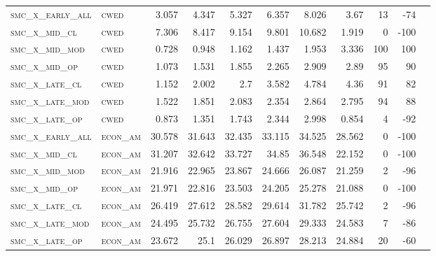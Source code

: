 \begin{landscape}
\begin{center}
\begin{footnotesize}
\begin{longtable}{llrrrrrr|rrr}
\textsc{smc\_x\_early\_all} & \textsc{cwed      }   & 3.057      & 4.347      & 5.327      & 6.357      & 8.026      & 3.67       & 13    & -74    \\
\textsc{smc\_x\_mid\_cl   } & \textsc{cwed      }   & 7.306      & 8.417      & 9.154      & 9.801      & 10.682     & 1.919      & 0     & -100   \\
\textsc{smc\_x\_mid\_mod  } & \textsc{cwed      }   & 0.728      & 0.948      & 1.162      & 1.437      & 1.953      & 3.336      & 100   & 100    \\
\textsc{smc\_x\_mid\_op   } & \textsc{cwed      }   & 1.073      & 1.531      & 1.855      & 2.265      & 2.909      & 2.89       & 95    & 90     \\
\textsc{smc\_x\_late\_cl  } & \textsc{cwed      }   & 1.152      & 2.002      & 2.7        & 3.582      & 4.784      & 4.36       & 91    & 82     \\
\textsc{smc\_x\_late\_mod } & \textsc{cwed      }   & 1.522      & 1.851      & 2.083      & 2.354      & 2.864      & 2.795      & 94    & 88     \\
\textsc{smc\_x\_late\_op  } & \textsc{cwed      }   & 0.873      & 1.351      & 1.743      & 2.344      & 2.998      & 0.854      & 4     & -92    \\
\textsc{smc\_x\_early\_all} & \textsc{econ\_am  }   & 30.578     & 31.643     & 32.435     & 33.115     & 34.525     & 28.562     & 0     & -100   \\
\textsc{smc\_x\_mid\_cl   } & \textsc{econ\_am  }   & 31.207     & 32.642     & 33.727     & 34.85      & 36.548     & 22.152     & 0     & -100   \\
\textsc{smc\_x\_mid\_mod  } & \textsc{econ\_am  }   & 21.916     & 22.965     & 23.867     & 24.666     & 26.087     & 21.259     & 2     & -96    \\
\textsc{smc\_x\_mid\_op   } & \textsc{econ\_am  }   & 21.971     & 22.816     & 23.503     & 24.205     & 25.278     & 21.088     & 0     & -100   \\
\textsc{smc\_x\_late\_cl  } & \textsc{econ\_am  }   & 26.419     & 27.612     & 28.582     & 29.614     & 31.782     & 25.742     & 2     & -96    \\
\textsc{smc\_x\_late\_mod } & \textsc{econ\_am  }   & 24.495     & 25.732     & 26.755     & 27.604     & 29.333     & 24.583     & 7     & -86    \\
\textsc{smc\_x\_late\_op  } & \textsc{econ\_am  }   & 23.672     & 25.1       & 26.029     & 26.897     & 28.213     & 24.884     & 20    & -60    \\

\end{longtable}
\end{footnotesize}
\end{center}
\end{landscape}
